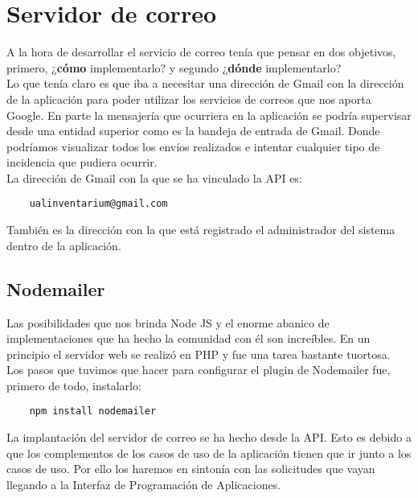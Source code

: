 \section{Servidor de correo}
A la hora de desarrollar el servicio de correo tenía que pensar en dos objetivos, primero, ¿\textbf{cómo} implementarlo? y segundo ¿\textbf{dónde} implementarlo?
\\Lo que tenía claro es que iba a necesitar una dirección de Gmail con la dirección de la aplicación para poder utilizar los servicios de correos que nos aporta Google. En parte la mensajería que ocurriera en la aplicación se podría supervisar desde una entidad superior como es la bandeja de entrada de Gmail. Donde podríamos visualizar todos los envíos realizados e intentar cualquier tipo de incidencia que pudiera ocurrir.
\\La dirección de Gmail con la que se ha vinculado la API es:
\begin{verbatim}
    ualinventarium@gmail.com
\end{verbatim}
También es la dirección con la que está registrado el administrador del sistema dentro de la aplicación.

\subsection{Nodemailer}
Las posibilidades que nos brinda Node JS y el enorme abanico de implementaciones que ha hecho la comunidad con él son increíbles. En un principio el servidor web se realizó en PHP y fue una tarea bastante tuortosa.
\\Los pasos que tuvimos que hacer para configurar el plugin de Nodemailer fue, primero de todo, instalarlo:
\begin{verbatim}
    npm install nodemailer
\end{verbatim}
La implantación del servidor de correo se ha hecho desde la API. Esto es debido a que los complementos de los casos de uso de la aplicación tienen que ir junto a los casos de uso. Por ello los haremos en sintonía con las solicitudes que vayan llegando a la Interfaz de Programación de Aplicaciones.

